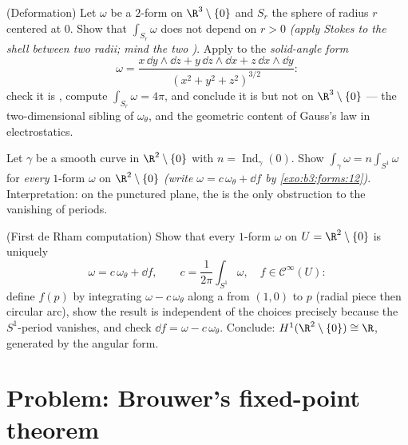 \begin{exercise}[$\star\star\star$]\label{exo:b3:forms:10}
(Deformation) Let $\omega$ be a \emph{} $2$-form on
$\R^3\setminus\{0\}$ and $S_r$ the sphere of radius $r$
centered at $0$. Show that $\int_{S_r}\omega$ does not
depend on $r > 0$ \emph{(apply Stokes to the shell between
two radii; mind the two  )}. Apply to
the \emph{solid-angle form}
\[
\omega = \frac{x\,\dd y\wedge\dd z + y\,\dd z\wedge\dd x +
z\,\dd x\wedge\dd y}{(x^2 + y^2 + z^2)^{3/2}} :
\]
check it is , compute $\int_{S_r}\omega = 4\pi$, and
conclude it is  but not  on
$\R^3\setminus\{0\}$ --- the two-dimensional sibling of
$\omega_\theta$, and the geometric content of Gauss's law
in electrostatics.
\end{exercise}

\begin{exercise}[$\star\star$]\label{exo:b3:forms:11}
Let $\gamma$ be a smooth  curve in
$\R^2\setminus\{0\}$ with $n = \operatorname{Ind}_\gamma(0)$.
Show $\int_\gamma\omega = n\int_{S^1}\omega$ for
\emph{every}  $1$-form $\omega$ on
$\R^2\setminus\{0\}$ \emph{(write $\omega = c\,\omega_\theta
+ \dd f$ by \cref{exo:b3:forms:12})}. Interpretation: on the
punctured plane, the  is the only obstruction
to the vanishing of periods.
\end{exercise}

\begin{exercise}[$\star\star\star$]\label{exo:b3:forms:12}
(First de Rham computation) Show that every  $1$-form
$\omega$ on $U = \R^2\setminus\{0\}$ is uniquely
\[
\omega = c\,\omega_\theta + \dd f,
\qquad c = \frac1{2\pi}\int_{S^1}\omega,\quad f \in
\mathcal C^\infty(U) :
\]
define $f(p)$ by integrating $\omega - c\,\omega_\theta$
along a  from $(1,0)$ to $p$ (radial piece then circular
arc), show the result is independent of the choices
precisely because the $S^1$-period vanishes, and check $\dd
f = \omega - c\,\omega_\theta$. Conclude:
$H^1(\R^2\setminus\{0\}) \cong \R$, generated by the
angular form.
\end{exercise}

\section{Problem: Brouwer's fixed-point theorem}

